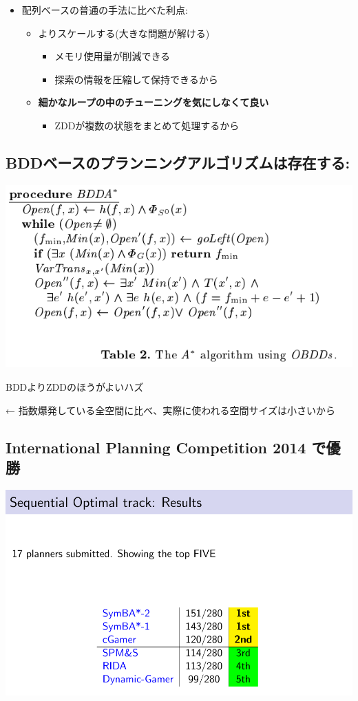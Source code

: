 \begin{itemize}
\item 配列ベースの普通の手法に比べた利点:
\begin{itemize}
\item よりスケールする(大きな問題が解ける)
\begin{itemize}
\item メモリ使用量が削減できる
\item 探索の情報を圧縮して保持できるから
\end{itemize}
\item \textbf{細かなループの中のチューニングを気にしなくて良い}
\begin{itemize}
\item ZDDが複数の状態をまとめて処理するから
\end{itemize}
\end{itemize}
\end{itemize}

\subsection{BDDベースのプランニングアルゴリズムは存在する:}
\label{sec-9-1}

\includegraphics{img/static/bdd-astar.png}

BDDよりZDDのほうがよいハズ

← 指数爆発している全空間に比べ、実際に使われる空間サイズは小さいから

\subsection{International Planning Competition 2014 で優勝}
\label{sec-9-2}

\includegraphics{img/static/bdd-astar-ipc.png}

